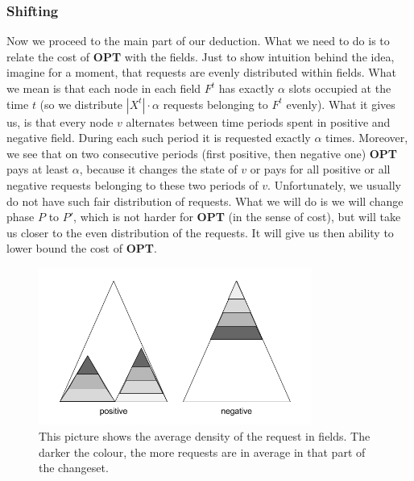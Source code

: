 \subsubsection{Shifting} Now we proceed to the main part of our deduction. What
we need to do is to relate the cost of \textbf{OPT} with the fields. Just to
show intuition behind the idea, imagine for a moment, that requests are evenly
distributed within fields. What we mean is that each node in each field $F^t$
has exactly $\alpha$ slots occupied at the time $t$ (so we distribute $|X^t|
\cdot \alpha$ requests belonging to $F^t$ evenly). What it gives us, is that
every node $v$ alternates between time periods spent in positive and negative
field. During each such period it is requested exactly $\alpha$ times. Moreover,
we see that on two consecutive periods (first positive, then negative one)
\textbf{OPT} pays at least $\alpha$, because it changes the state of $v$ or pays
for all positive or all negative requests belonging to these two periods of $v$.
Unfortunately, we usually do not have such fair distribution of requests. What
we will do is we will change phase $P$ to $P'$, which is not harder for
\textbf{OPT} (in the sense of cost), but will take us closer to the even
distribution of the requests. It will give us then ability to lower bound the
cost of \textbf{OPT}.  \begin{figure} \begin{center}
\includegraphics[width=0.8\textwidth]{density_pic.png} \end{center}
\caption{This picture shows the average density of the request in fields. The
darker the colour, the more requests are in average in that part of the
changeset.} \label{fig:density} \end{figure}

